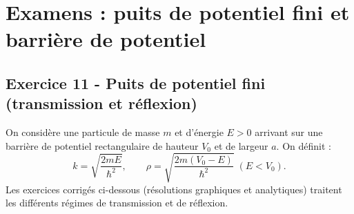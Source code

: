 \documentclass[12pt,a4paper]{article}
\begin{document}
\newpage
\section{Examens : puits de potentiel fini et barrière de potentiel}

\subsection*{Exercice 11 - Puits de potentiel fini (transmission et réflexion) \niveau{\difficile}}

\begin{boiteexercice}
On considère une particule de masse $m$ et d'énergie $E > 0$ arrivant sur une barrière de potentiel rectangulaire de hauteur $V_0$ et de largeur $a$. On définit :
\[
k = \sqrt{\frac{2mE}{\hbar^2}}, \qquad \rho = \sqrt{\frac{2m(V_0-E)}{\hbar^2}} \; (E < V_0).
\]
Les exercices corrigés ci-dessous (résolutions graphiques et analytiques) traitent les différents régimes de transmission et de réflexion.
\end{boiteexercice}
\end{document}
